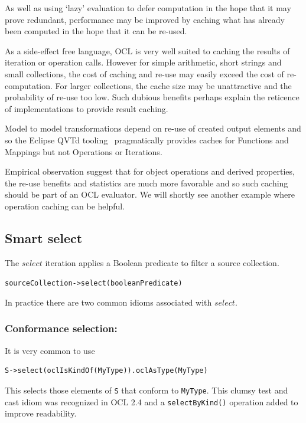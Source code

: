 \documentclass{llncs}
\begin{document}
As well as using `lazy' evaluation to defer computation in the hope that it may prove redundant, performance may be improved by caching what has already been computed in the hope that it can be re-used.

As a side-effect free language, OCL is very well suited to caching the results of iteration or operation calls. However for simple arithmetic, short strings and small collections, the cost of caching and re-use may easily exceed the cost of re-computation. For larger collections, the cache size may be unattractive and the probability of re-use too low. Such dubious benefits perhaps explain the reticence of implementations to provide result caching.

Model to model transformations depend on re-use of created output elements and so the Eclipse QVTd tooling~\cite{Eclipse-QVTd} pragmatically provides caches for Functions and Mappings but not Operations or Iterations.

Empirical observation suggest that for object operations and derived properties, the re-use benefits and statistics are much more favorable and so such caching should be part of an OCL evaluator. We will shortly see another example where operation caching can be helpful.

\subsection{Smart select}

The $select$ iteration applies a Boolean predicate to filter a source collection.

\verb$sourceCollection->select(booleanPredicate)$

In practice there are two common idioms associated with $select$.

\subsubsection{Conformance selection:}

It is very common to use

\begin{verbatim}
S->select(oclIsKindOf(MyType)).oclAsType(MyType)
\end{verbatim}

This selects those elements of \verb$S$ that conform to \verb$MyType$. This clumsy test and cast idiom was recognized in OCL 2.4 and a \verb$selectByKind()$ operation added to improve readability.
\end{document}
